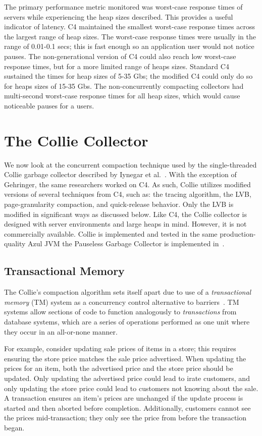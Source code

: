 \documentclass{sig-alternate}
\begin{document}
The primary performance metric monitored was worst-case response times
of servers while experiencing the heap sizes
described. This provides a useful indicator of latency.
C4 maintained the smallest 
worst-case response times across the largest range of heap sizes.
The worst-case response times were usually in the range of 0.01-0.1 secs;
this is fast enough so an application user would not notice pauses. 
The non-generational version of C4 could also reach low worst-case response times,
but for a more limited range of heaps sizes. Standard
C4 sustained the times for heap sizes of 5-35 Gbs; the modified C4 could
only do so for heaps sizes of 15-35 Gbs. The non-concurrently compacting
collectors had multi-second worst-case response times for all heap sizes,
which would cause noticeable pauses for a users.


\section{The Collie Collector}
\label{sec:collie}

We now look at the concurrent compaction technique used by the single-threaded
Collie garbage collector described by Iynegar et al.~\cite{Iyengar:Collie}.
With the exception of Gehringer, the same researchers worked on C4.
As such, Collie utilizes modified versions of several techniques from C4, such as:
the tracing algorithm, the LVB, page-granularity compaction, and quick-release behavior.
Only the LVB is modified in significant ways as discussed below.
Like C4, the Collie
collector is designed with server environments and large heaps in mind.
However, it is not commercially available. 
Collie is implemented and tested in 
the same production-quality Azul JVM the Pauseless Garbage Collector is implemented 
in~\cite{Click:Pauseless}. 


\subsection{Transactional Memory}
\label{sec:collieTM}

The Collie's compaction algorithm sets itself apart due to use 
of a \emph{transactional memory} (TM) system as a concurrency control 
alternative to barriers~\cite{Iyengar:Collie}. TM systems allow
sections of code to function 
analogously to \emph{transactions} from database systems, 
which are a series of operations performed as one unit where 
they occur in an all-or-none manner.

For example, consider updating sale prices of items in a store; this requires
ensuring the store price matches the sale price advertised. 
When updating the prices for an item, both the
advertised price and the store price should be updated. Only updating the
advertised price could lead to irate customers, and only updating the
store price could lead to customers not knowing about the sale. A transaction
ensures an item's prices are unchanged if the update process 
is started and then aborted before completion. Additionally, customers cannot
see the prices mid-transaction; they only see the price from before the transaction began.
\end{document}
